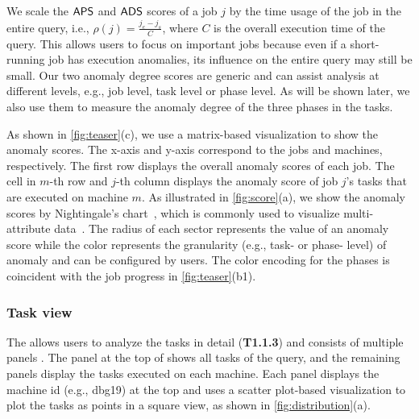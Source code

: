We scale the ${\mathsf{APS}}$ and ${\mathsf{ADS}}$ scores of a job $j$ by the time usage of the job in the entire query, i.e., $\rho(j) = \frac{j_e - j_s}{C}$, where $C$ is the overall execution time of the query. This allows users to focus on important jobs because even if a short-running job has execution anomalies, its influence on the entire query may still be small. 
Our two anomaly degree scores are generic and can assist analysis at different levels, e.g., job level, task level or phase level. As will be shown later, we also use them to measure the anomaly degree of the three phases in the tasks.


 As shown in \autoref{fig:teaser}(c), we use a matrix-based visualization to show the anomaly scores. 
The x-axis and y-axis correspond to the jobs and machines, respectively. 
The first row displays the overall anomaly scores of each job. 
The cell in $m$-th row and $j$-th column displays the anomaly score of job $j$'s tasks that are executed on machine $m$. 
As illustrated in \autoref{fig:score}(a), we show the anomaly scores by Nightingale's chart~\cite{brasseur2005florence}, which is commonly used to visualize multi-attribute data~\cite{zhao2017skylens}. 
The radius of each sector represents the value of an anomaly score while the color represents the granularity (e.g., task- or phase- level) of anomaly and can be configured by users. 
The color encoding for the phases is coincident with the job progress in \autoref{fig:teaser}(b1).



\subsubsection{Task view}\label{sec:task}
The  allows users to analyze the tasks in detail (\textbf{T1.1.3}) and consists of multiple panels . The panel at the top of  shows all tasks of the  query, and the remaining panels display the tasks executed on each machine.
Each panel displays the machine id (e.g., dbg19) at the top and uses a scatter plot-based visualization to plot the tasks as points in a square view, as shown in \autoref{fig:distribution}(a).


